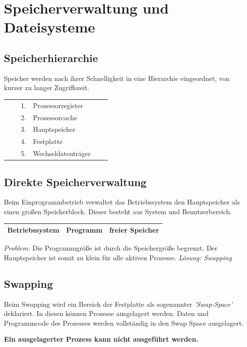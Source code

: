 \documentclass[12pt,a4paper]{article}
\begin{document}
\section{Speicherverwaltung und Dateisysteme}
	\subsection{Speicherhierarchie}
		Speicher werden nach ihrer Schnelligkeit in eine Hierarchie eingeordnet, von kurzer zu langer Zugriffszeit.
		\begin{center}
			\begin{tabularx}{13cm}{XXXlXX}
				&&1.& Prozessorregister&&\\
				&&2.& Prozessorcache&&\\
				&&3.& Hauptspeicher&&\\
				&&4.& Festplatte&&\\
				&&5.& Wechseldatenträger&&\\
			\end{tabularx}
		\end{center}

	\subsection{Direkte Speicherverwaltung}
		Beim Einprogrammbetrieb verwaltet das Betriebssystem den Hauptspeicher als einen großen Speicherblock. Dieser besteht aus System und Benutzerbereich.
		\begin{center}
			\begin{tabularx}{13cm}{|X|X|X|}
				\hline
				Betriebssystem&Programm&freier Speicher \\
				\hline
			\end{tabularx}
		\end{center}
		\textit{Problem:}\newline
		Die Programmgröße ist durch die Speichergröße begrenzt. Der Hauptspeicher ist somit zu klein für alle aktiven Prozesse.\newline
		\textit{Lösung: Swapping}

	\subsection{Swapping}
		Beim Swapping wird ein Bereich der Festplatte als sogenannter \textit{'Swap-Space'} deklariert. In diesen können Prozesse ausgelagert werden. Daten und Programmcode des Prozesses werden vollständig in den Swap Space ausgelagert.				
		\begin{center}
			\textbf{Ein ausgelagerter Prozess kann nicht ausgeführt werden.}
		\end{center}
		
\end{document}

